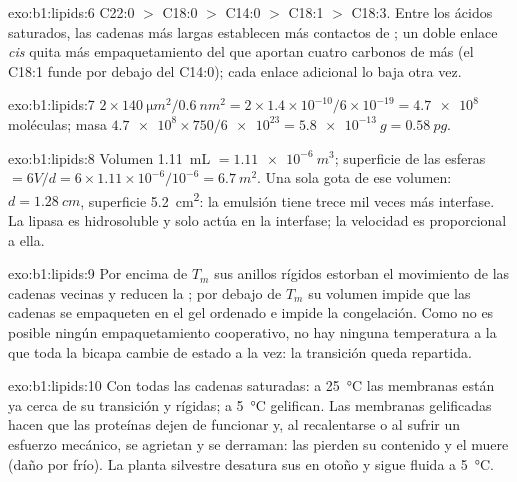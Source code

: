 \begin{solution}{exo:b1:lipids:6}
C22:0 $>$ C18:0 $>$ C14:0 $>$ C18:1 $>$ C18:3. Entre los ácidos saturados,
las cadenas más largas establecen más contactos de ; un doble
enlace \emph{cis} quita más empaquetamiento del que aportan cuatro carbonos
de más (el C18:1 funde por debajo del C14:0); cada enlace adicional lo baja
otra vez.
\end{solution}

\begin{solution}{exo:b1:lipids:7}
$2\times\qty{140}{\micro m^2}/\qty{0.6}{nm^2} = 2\times 1.4\times
10^{-10}/6\times 10^{-19} = \num{4.7e8}$ moléculas; masa
$\num{4.7e8}\times 750/\num{6e23} = \qty{5.8e-13}{g} = \qty{0.58}{pg}$.
\end{solution}

\begin{solution}{exo:b1:lipids:8}
Volumen \qty{1.11}{mL} $= \qty{1.11e-6}{m^3}$; superficie de las esferas
$= 6V/d = 6\times 1.11\times 10^{-6}/10^{-6} = \qty{6.7}{m^2}$. Una sola
gota de ese volumen: $d = \qty{1.28}{cm}$, superficie \qty{5.2}{cm^2}: la
emulsión tiene trece mil veces más interfase. La lipasa es hidrosoluble y
solo actúa en la interfase; la velocidad es proporcional a ella.
\end{solution}

\begin{solution}{exo:b1:lipids:9}
Por encima de $T_m$ sus anillos rígidos estorban el movimiento de las
cadenas vecinas y reducen la ; por debajo de $T_m$ su volumen impide
que las cadenas se empaqueten en el gel ordenado e impide la congelación.
Como no es posible ningún empaquetamiento cooperativo, no hay ninguna
temperatura a la que toda la bicapa cambie de estado a la vez: la transición
queda repartida.
\end{solution}

\begin{solution}{exo:b1:lipids:10}
Con todas las cadenas saturadas: a \qty{25}{\celsius} las membranas están ya
cerca de su transición y rígidas; a \qty{5}{\celsius} gelifican. Las
membranas gelificadas hacen que las proteínas dejen de funcionar y, al
recalentarse o al sufrir un esfuerzo mecánico, se agrietan y se derraman:
las  pierden su contenido y el  muere (daño por frío). La
planta silvestre desatura sus  en otoño y sigue fluida a
\qty{5}{\celsius}.
\end{solution}

